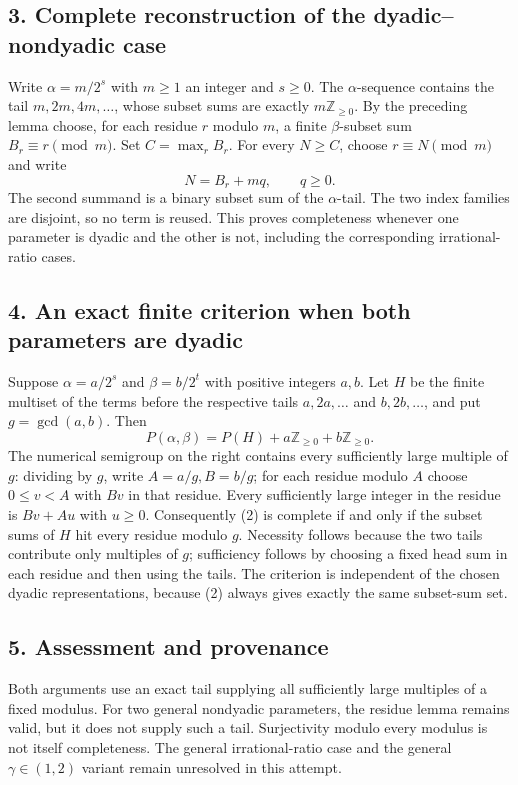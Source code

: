 \subsection*{3. Complete reconstruction of the dyadic--nondyadic case}
Write $\alpha=m/2^s$ with $m\ge1$ an integer and $s\ge0$.
The $\alpha$-sequence contains the tail
$m,2m,4m,\ldots$, whose subset sums are exactly $m\mathbb Z_{\ge0}$.
By the preceding lemma choose, for each residue $r$ modulo $m$,
a finite $\beta$-subset sum $B_r\equiv r\pmod m$. Set $C=\max_r B_r$.
For every $N\ge C$, choose $r\equiv N\pmod m$ and write
\[
 N=B_r+m q,\qquad q\ge0.
\]
The second summand is a binary subset sum of the $\alpha$-tail.
The two index families are disjoint, so no term is reused.
This proves completeness whenever one parameter is dyadic and the
other is not, including the corresponding irrational-ratio cases.

\subsection*{4. An exact finite criterion when both parameters are dyadic}
Suppose $\alpha=a/2^s$ and $\beta=b/2^t$ with positive integers $a,b$.
Let $H$ be the finite multiset of the terms before the respective
tails $a,2a,\ldots$ and $b,2b,\ldots$, and put $g=\gcd(a,b)$.
Then
\[
 P(\alpha,\beta)=P(H)+a\mathbb Z_{\ge0}+b\mathbb Z_{\ge0}.            \tag{2}
\]
The numerical semigroup on the right contains every sufficiently
large multiple of $g$: dividing by $g$, write $A=a/g,B=b/g$;
for each residue modulo $A$ choose $0\le v<A$ with $Bv$ in that
residue. Every sufficiently large integer in the residue is
$Bv+Au$ with $u\ge0$.
Consequently (2) is complete if and only if the subset sums of
$H$ hit every residue modulo $g$. Necessity follows because the
two tails contribute only multiples of $g$; sufficiency follows
by choosing a fixed head sum in each residue and then using the tails.
The criterion is independent of the chosen dyadic representations,
because (2) always gives exactly the same subset-sum set.

\subsection*{5. Assessment and provenance}
Both arguments use an exact tail supplying all sufficiently large
multiples of a fixed modulus. For two general nondyadic parameters,
the residue lemma remains valid, but it does not supply such a tail.
Surjectivity modulo every modulus is not itself completeness.
The general irrational-ratio case and the general $\gamma\in(1,2)$
variant remain unresolved in this attempt.

